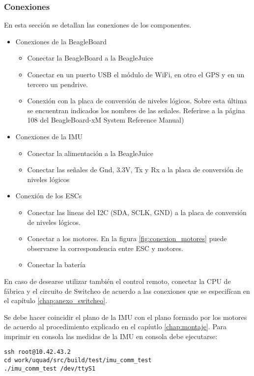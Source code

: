 \documentclass[main]{subfiles}
\begin{document}
\subsubsection{Conexiones}
En esta secci\'on se detallan las conexiones de los componentes.
\begin{itemize}
\item Conexiones de la BeagleBoard
	\begin{itemize}
	\item Conectar la BeagleBoard a la BeagleJuice
	\item Conectar en un puerto USB el módulo de WiFi, en otro el GPS y en un tercero un pendrive.
	\item Conexión con la placa de conversión de niveles lógicos. Sobre esta \'ultima se encuentran indicados los nombres de las señales. Referirse a la p\'agina 108 del BeagleBoard-xM System Reference Manual)
	\end{itemize}
\item Conexiones de la IMU
	\begin{itemize}
	\item Conectar la alimentaci\'on a la BeagleJuice
	\item Conectar las señales de Gnd, 3.3V, Tx y Rx a la placa de conversión de niveles l\'ogicos
	\end{itemize}
\item Conexión de los ESCs
	\begin{itemize}
	\item Conectar las lineas del I2C (SDA, SCLK, GND) a la placa de conversión de niveles l\'ogicos.
	\item Conectar a los motores. En la figura \ref{fig:conexion_motores} puede observarse la correspondencia entre ESC y motores.
	\item Conectar la bater\'ia
	\end{itemize}
\end{itemize}

En caso de desearse utilizar también el control remoto, conectar la CPU de f\'abrica y el circuito de Switcheo de acuerdo a las conexiones que se especif\'ican en el cap\'itulo \ref{chap:anexo_switcheo}.

Se debe hacer coincidir el plano de la IMU con el plano formado por los motores de acuerdo al procedimiento explicado en el cap\'iutlo \ref{chap:montaje}. Para imprimir en consola las medidas de la IMU en consola debe ejecutarse:
\begin{verbatim}
ssh root@10.42.43.2
cd work/uquad/src/build/test/imu_comm_test
./imu_comm_test /dev/ttyS1
\end{verbatim}
\end{document}

